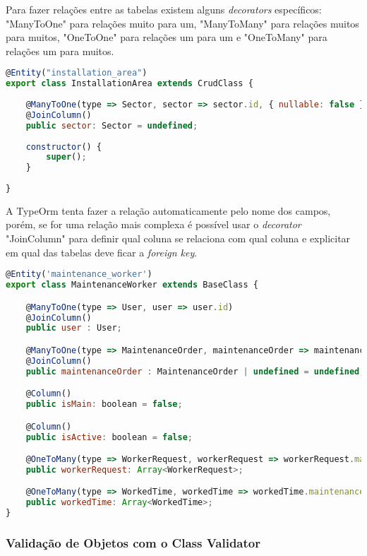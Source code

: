 Para fazer relações entre as tabelas existem alguns \textit{decorators} específicos: "ManyToOne" para relações muito para um, "ManyToMany" para relações muitos para muitos, "OneToOne" para relações um para um e "OneToMany" para relações um para muitos.

\begin{lstlisting}[language=JavaScript, caption={Mapeamento de propriedades da tabela área de installation\_area}]
@Entity("installation_area")
export class InstallationArea extends CrudClass {
	
	@ManyToOne(type => Sector, sector => sector.id, { nullable: false })
	@JoinColumn()
	public sector: Sector = undefined;
	
	constructor() {
		super();
	}
	
}
\end{lstlisting}

A TypeOrm tenta fazer a relação automaticamente pelo nome dos campos, porém, se for uma relação mais complexa é possível usar o \textit{decorator} "JoinColumn" para definir qual coluna se relaciona com qual coluna e explicitar em qual das tabelas deve ficar a \textit{foreign key}.

\begin{lstlisting}[language=JavaScript, caption={Mapeamento de propriedades da tabela maintenance\_worker}]
@Entity('maintenance_worker')
export class MaintenanceWorker extends BaseClass {

	@ManyToOne(type => User, user => user.id)
	@JoinColumn()
	public user : User;

	@ManyToOne(type => MaintenanceOrder, maintenanceOrder => maintenanceOrder.id, { cascade: false })
	@JoinColumn()
	public maintenanceOrder : MaintenanceOrder | undefined = undefined;

	@Column()
	public isMain: boolean = false;

	@Column()
	public isActive: boolean = false;

	@OneToMany(type => WorkerRequest, workerRequest => workerRequest.maintenanceWorker, { cascade: false })
	public workerRequest: Array<WorkerRequest>;

	@OneToMany(type => WorkedTime, workedTime => workedTime.maintenanceWorker, { cascade: false })
	public workedTime: Array<WorkedTime>;
}
\end{lstlisting}

\subsubsection{Validação de Objetos com o Class Validator}

